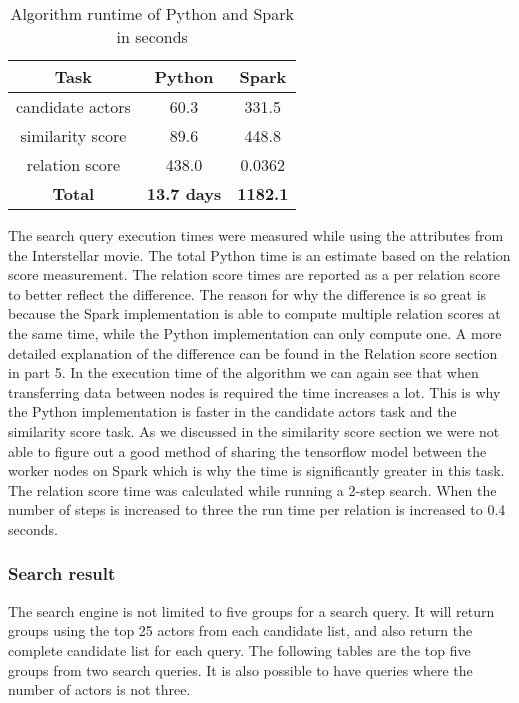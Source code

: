 \begin{table}[H]
	\centering
    \begin{tabular}{ |c|c|c| } 
        \hline
        \textbf{Task} & \textbf{Python} & \textbf{Spark} \\ 
        \hline
        candidate actors & 60.3 & 331.5 \\ 
        similarity score & 89.6 & 448.8 \\ 
        relation score & 438.0 & 0.0362 \\ \hline
        \textbf{Total} & \textbf{13.7 days} & \textbf{1182.1} \\ 
        \hline
    \end{tabular}
	\caption{Algorithm runtime of Python and Spark in seconds}
	\label{tab:algorithm runtime}
\end{table}



The search query execution times were measured while using the attributes from the Interstellar movie. The total Python time is an estimate based on the relation score measurement. The relation score times are reported as a per relation score to better reflect the difference. The reason for why the difference is so great is because the Spark implementation is able to compute multiple relation scores at the same time, while the Python implementation can only compute one. A more detailed explanation of the difference can be found in the Relation score section in part 5. In the execution time of the algorithm we can again see that when transferring data between nodes is required the time increases a lot. This is why the Python implementation is faster in the candidate actors task and the similarity score task. As we discussed in the similarity score section we were not able to figure out a good method of sharing the tensorflow model between the worker nodes on Spark which is why the time is significantly greater in this task. The relation score time was calculated while running a 2-step search. When the number of steps is increased to three the run time per relation is increased to 0.4 seconds.



\subsubsection{Search result}

The search engine is not limited to five groups for a search query. It will return groups using the top 25 actors from each candidate list, and also return the complete candidate list for each query. The following tables are the top five groups from two search queries. It is also possible to have queries where the number of actors is not three. 



